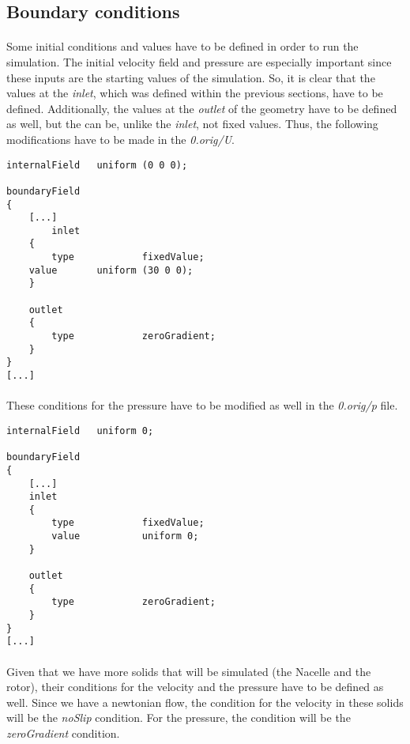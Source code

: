\subsection{Boundary conditions}

\paragraph{}Some initial conditions and values have to be defined in order to run the simulation. The initial velocity field and pressure are especially important since these inputs are the starting values of the simulation. So, it is clear that the values at the \textit{inlet}, which was defined within the previous sections, have to be defined. Additionally, the values at the \textit{outlet} of the geometry have to be defined as well, but the can be, unlike the \textit{inlet}, not fixed values. Thus, the following modifications have to be made in the  \textit{0.orig/U}.

\begin{footnotesize}
\begin{verbatim}
internalField   uniform (0 0 0);

boundaryField
{
	[...]
	    inlet
    {
        type            fixedValue;
	value		uniform (30 0 0);
    }

    outlet
    {
        type            zeroGradient;
    }
}
[...]
\end{verbatim}
\end{footnotesize}
	
\paragraph{}These conditions for the pressure have to be modified as well in the \textit{0.orig/p} file.

\begin{footnotesize}
\begin{verbatim}
internalField   uniform 0;

boundaryField
{
	[...]
    inlet
    {
        type            fixedValue;
	    value		    uniform 0;
    }

    outlet
    {
        type            zeroGradient;
    }
}
[...]
\end{verbatim}
\end{footnotesize}


\paragraph{}Given that we have more solids that will be simulated (the Nacelle and the rotor), their conditions for the velocity and the pressure have to be defined as well. Since we have a newtonian flow, the condition for the velocity in these solids will be  the \textit{noSlip} condition. For the pressure, the condition will be the \textit{zeroGradient} condition.

